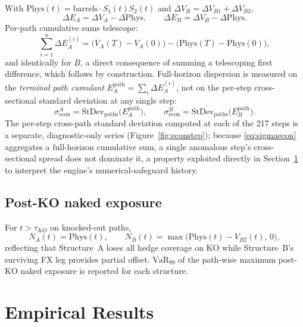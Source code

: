 \documentclass[11pt,a4paper]{article}
\begin{document}
With $\mathrm{Phys}(t)=\mathrm{barrels}\cdot S_1(t)S_2(t)$ and $\Delta V_B=\Delta V_{B1}+\Delta V_{B2}$,
\begin{equation}
\Delta E_A = \Delta V_A-\Delta\mathrm{Phys}, \qquad \Delta E_B = \Delta V_B-\Delta\mathrm{Phys}.
\end{equation}
Per-path cumulative sums telescope:
\begin{equation}
\label{eq:telescope}
\sum_{i=1}^{n}\Delta E_A^{(i)} = \big(V_A(T)-V_A(0)\big)-\big(\mathrm{Phys}(T)-\mathrm{Phys}(0)\big),
\end{equation}
and identically for $B$, a direct consequence of summing a telescoping first difference, which follows by construction. Full-horizon dispersion is measured on the \emph{terminal path cumulant} $E_A^{\mathrm{path}}=\sum_{i}\Delta E_A^{(i)}$, not on the per-step cross-sectional standard deviation at any single step:
\begin{equation}
\label{eq:sigmaecon}
\sigma_{\mathrm{econ}}^A = \mathrm{StDev}_{\mathrm{paths}}\big(E_A^{\mathrm{path}}\big), \qquad \sigma_{\mathrm{econ}}^B = \mathrm{StDev}_{\mathrm{paths}}\big(E_B^{\mathrm{path}}\big).
\end{equation}
The per-step cross-path standard deviation computed at each of the 217 steps is a separate, diagnostic-only series (Figure~\ref{fig:econstep}); because \eqref{eq:sigmaecon} aggregates a full-horizon cumulative sum, a single anomalous step's cross-sectional spread does not dominate it, a property exploited directly in Section~\ref{sec:results} to interpret the engine's numerical-safeguard history.

\subsection{Post-KO naked exposure}
\label{sec:naked}

For $t>\tau_{KO}$ on knocked-out paths,
\begin{equation}
N_A(t)=\mathrm{Phys}(t), \qquad N_B(t)=\max\big(\mathrm{Phys}(t)-V_{B2}(t),\,0\big),
\end{equation}
reflecting that Structure~A loses all hedge coverage on KO while Structure~B's surviving FX leg provides partial offset. $\mathrm{VaR}_{99}$ of the path-wise maximum post-KO naked exposure is reported for each structure.

\section{Empirical Results}
\label{sec:results}
\end{document}

